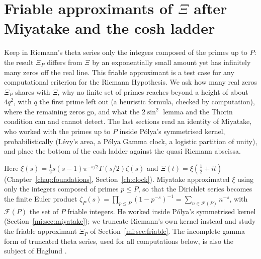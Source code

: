 \chapter{Friable approximants of \texorpdfstring{$\Xi$}{Xi} after Miyatake and the cosh ladder}\label{chap:miyatake}\label{ch:miyatake}

\ifdefined\conjecture\else\theoremstyle{sc}\newtheorem{conjecture}[theorem]{Conjecture}\theoremstyle{scr}\fi

Keep in Riemann's theta series only the integers composed of the primes up to $P$: the result $\Xi_P$ differs from $\Xi$ by an exponentially small amount yet has infinitely many zeros off the real line. This friable approximant is a test case for any computational criterion for the Riemann Hypothesis. We ask how many real zeros $\Xi_P$ shares with $\Xi$, why no finite set of primes reaches beyond a height of about $4q^2$, with $q$ the first prime left out (a heuristic formula, checked by computation), where the remaining zeros go, and what the $2\sin^2$ lemma and the Thorin condition can and cannot detect. The last sections read an identity of Miyatake, who worked with the primes up to $P$ inside P\'olya's symmetrised kernel, probabilistically (L\'evy's area, a P\'olya Gamma clock, a logistic partition of unity), and place the bottom of the cosh ladder against the quasi Riemann abscissa.

Here $\xi(s)=\tfrac12s(s-1)\pi^{-s/2}\Gamma(s/2)\zeta(s)$ and $\Xi(t)=\xi(\tfrac12+it)$ (Chapter~\ref{chap:foundations}, Section~\ref{ch:clock}). Miyatake \cite{Miyatake51b,Miyatake51a} approximated $\xi$ using only the integers composed of primes $p\le P$, so that the Dirichlet series becomes the finite Euler product $\zeta_P(s)=\prod_{p\le P}(1-p^{-s})^{-1}=\sum_{n\in\mathcal F(P)}n^{-s}$, with $\mathcal F(P)$ the set of $P$ friable integers. %
He worked inside P\'olya's symmetrised kernel (Section~\ref{mi:sec:miyatake}); we truncate Riemann's own kernel instead and study the friable approximant $\Xi_P$ of Section~\ref{mi:sec:friable}. The incomplete gamma form of truncated theta series, used for all computations below, is also the subject of Haglund \cite{Haglund09}. %

